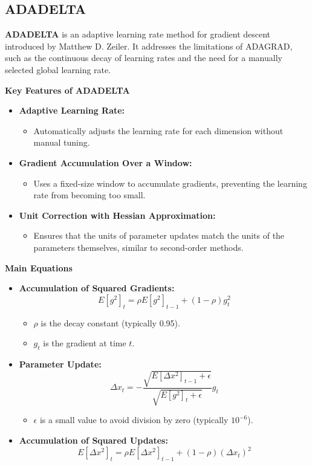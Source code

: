 \documentclass{ieeeojies}
\begin{document}
\subsection{ADADELTA}

\textbf{ADADELTA} is an adaptive learning rate method for gradient descent introduced by Matthew D. Zeiler. It addresses the limitations of ADAGRAD, such as the continuous decay of learning rates and the need for a manually selected global learning rate.

\textbf{Key Features of ADADELTA}
\begin{itemize}
    \item \textbf{Adaptive Learning Rate:}
    \begin{itemize}
        \item Automatically adjusts the learning rate for each dimension without manual tuning.
    \end{itemize}
    \item \textbf{Gradient Accumulation Over a Window:}
    \begin{itemize}
        \item Uses a fixed-size window to accumulate gradients, preventing the learning rate from becoming too small.
    \end{itemize}
    \item \textbf{Unit Correction with Hessian Approximation:}
    \begin{itemize}
        \item Ensures that the units of parameter updates match the units of the parameters themselves, similar to second-order methods.
    \end{itemize}
\end{itemize}

\textbf{Main Equations}
\begin{itemize}
    \item \textbf{Accumulation of Squared Gradients:}
    \[
    E[g^2]_t = \rho E[g^2]_{t-1} + (1 - \rho) g_t^2
    \]
    \begin{itemize}
        \item \(\rho\) is the decay constant (typically 0.95).
        \item \(g_t\) is the gradient at time \(t\).
    \end{itemize}

    \item \textbf{Parameter Update:}
    \[
    \Delta x_t = - \frac{\sqrt{E[\Delta x^2]_{t-1} + \epsilon}}{\sqrt{E[g^2]_t + \epsilon}} g_t
    \]
    \begin{itemize}
        \item \(\epsilon\) is a small value to avoid division by zero (typically \(10^{-6}\)).
    \end{itemize}

    \item \textbf{Accumulation of Squared Updates:}
    \[
    E[\Delta x^2]_t = \rho E[\Delta x^2]_{t-1} + (1 - \rho) (\Delta x_t)^2
    \]
\end{itemize}
\end{document}
